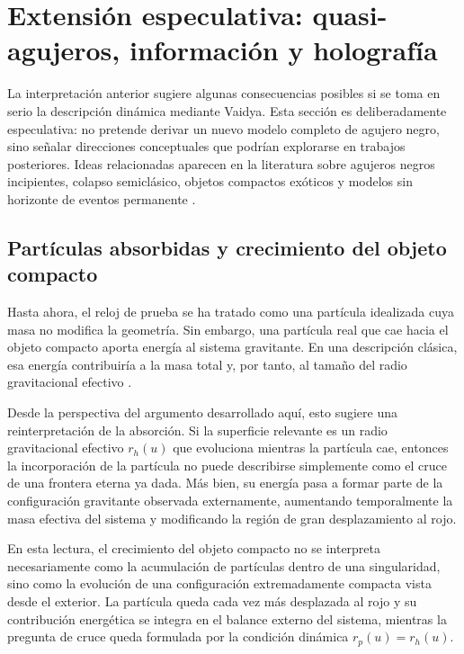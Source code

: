 \documentclass[
aps,
prd,
reprint,
superscriptaddress,
nofootinbib,
amsmath,
amssymb
]{revtex4-2}
\begin{document}
\section{Extensión especulativa: quasi-agujeros, información y holografía}

La interpretación anterior sugiere algunas consecuencias posibles si se toma en serio la descripción dinámica mediante Vaidya. Esta sección es deliberadamente especulativa: no pretende derivar un nuevo modelo completo de agujero negro, sino señalar direcciones conceptuales que podrían explorarse en trabajos posteriores. Ideas relacionadas aparecen en la literatura sobre agujeros negros incipientes, colapso semiclásico, objetos compactos exóticos y modelos sin horizonte de eventos permanente \cite{Vachaspati2007,Barcelo2008,MazurMottola2004,CardosoPani2019,Bardeen2014,Ashtekar2020}.

\subsection{Partículas absorbidas y crecimiento del objeto compacto}

Hasta ahora, el reloj de prueba se ha tratado como una partícula idealizada cuya masa no modifica la geometría. Sin embargo, una partícula real que cae hacia el objeto compacto aporta energía al sistema gravitante. En una descripción clásica, esa energía contribuiría a la masa total y, por tanto, al tamaño del radio gravitacional efectivo \cite{MTW1973,Wald1984}.

Desde la perspectiva del argumento desarrollado aquí, esto sugiere una reinterpretación de la absorción. Si la superficie relevante es un radio gravitacional efectivo $r_h(u)$ que evoluciona mientras la partícula cae, entonces la incorporación de la partícula no puede describirse simplemente como el cruce de una frontera eterna ya dada. Más bien, su energía pasa a formar parte de la configuración gravitante observada externamente, aumentando temporalmente la masa efectiva del sistema y modificando la región de gran desplazamiento al rojo.

En esta lectura, el crecimiento del objeto compacto no se interpreta necesariamente como la acumulación de partículas dentro de una singularidad, sino como la evolución de una configuración extremadamente compacta vista desde el exterior. La partícula queda cada vez más desplazada al rojo y su contribución energética se integra en el balance externo del sistema, mientras la pregunta de cruce queda formulada por la condición dinámica $r_p(u)=r_h(u)$.
\end{document}

